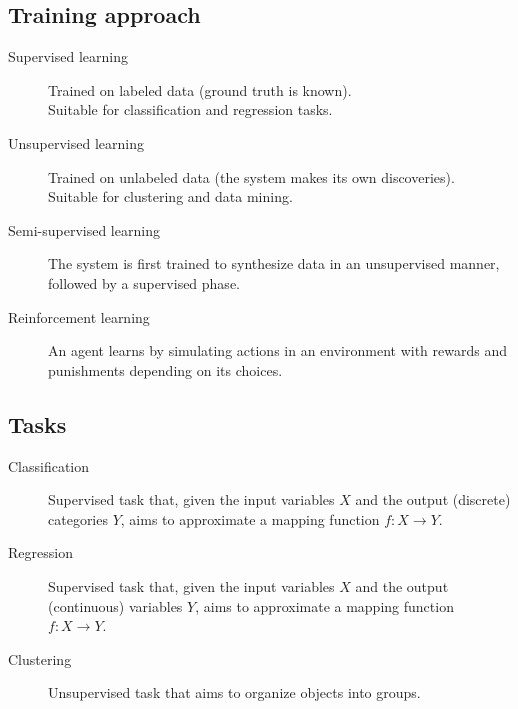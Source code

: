 \subsection{Training approach}
\begin{description}
    \item[Supervised learning] 
        Trained on labeled data (ground truth is known).\\
        Suitable for classification and regression tasks.

    \item[Unsupervised learning] 
        Trained on unlabeled data (the system makes its own discoveries).\\
        Suitable for clustering and data mining.

    \item[Semi-supervised learning] 
        The system is first trained to synthesize data in an unsupervised manner,
        followed by a supervised phase.

    \item[Reinforcement learning] 
        An agent learns by simulating actions in an environment with rewards and punishments depending on its choices.
\end{description}


\subsection{Tasks}
\begin{description}
    \item[Classification] 
        Supervised task that, given the input variables $X$ and the output (discrete) categories $Y$,
        aims to approximate a mapping function $f: X \rightarrow Y$.

    \item[Regression] 
        Supervised task that, given the input variables $X$ and the output (continuous) variables $Y$,
        aims to approximate a mapping function $f: X \rightarrow Y$.

    \item[Clustering] 
        Unsupervised task that aims to organize objects into groups.
\end{description}


